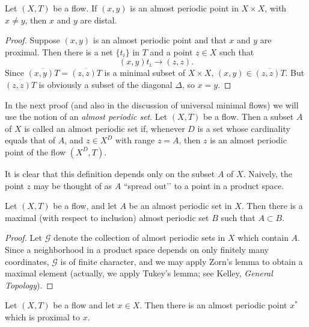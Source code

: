 \begin{proposition}
    Let $(X,T)$ be a flow. If $(x,y)$ is an almost periodic point in $X\times X$, with $x \neq y$, then $x$ and $y$ are distal.
\end{proposition}


\begin{proof}
    Suppose $(x,y)$ is an almost periodic point and that $x$ and $y$ are proximal. Then there is a net $\{t_i\}$ in $T$ and a point $z\in X$ such that
    \[
        (x,y)t_i \longrightarrow (z,z).
    \]
    Since $\overline{(x,y)T} = \overline{(z,z)T}$ is a minimal subset of $X\times X$, $(x,y)\in \overline{(z,z)T}$. But $\overline{(z,z)T}$ is obviously a subset of the diagonal $\Delta$, so $x=y$.

\end{proof}



In the next proof (and also in the discussion of universal minimal flows) we will use the notion of an \emph{almost periodic set}. Let $(X,T)$ be a flow. Then a subset $A$ of $X$ is called an almost periodic set if, whenever $D$ is a set whose cardinality equals that of $A$, and $z\in X^D$ with range $z = A$, then $z$ is an almost periodic point of the flow $(X^D,T)$.


It is clear that this definition depends only on the subset $A$ of $X$. Naively, the point $z$ may be thought of as $A$ “spread out’’ to a point in a product space.


\begin{lemma}
    Let $(X,T)$ be a flow, and let $A$ be an almost periodic set in $X$. Then there is a maximal (with respect to inclusion) almost periodic set $B$ such that $A \subset B$.
\end{lemma}

\begin{proof}
    Let \(\mathcal{G}\) denote the collection of almost periodic sets in \(X\) which contain \(A\). Since a neighborhood in a product space depends on only finitely many coordinates, \(\mathcal{G}\) is of finite character, and we   may apply Zorn's lemma to obtain a maximal element (actually, we apply Tukey's lemma; see Kelley, \emph{General Topology}).
\end{proof}



\begin{theorem}
    \label{thm:proximal_almost_periodic_point}
    Let $(X,T)$ be a flow and let $x\in X$. Then there is an almost periodic point $x^*$ which is proximal to $x$.
\end{theorem}

